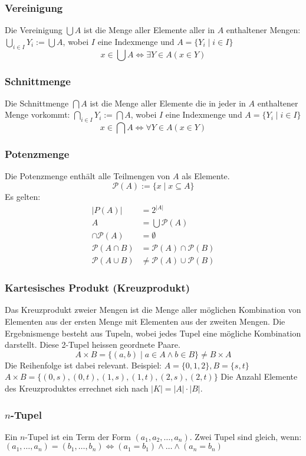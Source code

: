 \subsubsection{Vereinigung}
Die Vereinigung $\bigcup A$ ist die Menge aller Elemente aller in $A$ enthaltener Mengen: 
$\bigcup_{i \in I} Y_i := \bigcup A$, wobei $I$ eine Indexmenge und $A = \{Y_i \mid i \in I\}$
\begin{equation*}
	x \in \bigcup A \Leftrightarrow \exists Y \in A (x \in Y)
\end{equation*}

\subsubsection{Schnittmenge}
Die Schnittmenge $\bigcap A$ ist die Menge aller Elemente die in jeder in $A$ enthaltener Menge vorkommt:
$\bigcap_{i \in I} Y_i := \bigcap A$, wobei $I$ eine Indexmenge und $A = \{Y_i \mid i \in I\}$
\begin{equation*}
	x \in \bigcap A \Leftrightarrow \forall Y \in A (x \in Y)
\end{equation*}

\subsubsection{Potenzmenge}
Die Potenzmenge enthält alle Teilmengen von $A$ als Elemente.
\begin{equation*}
	\mathcal{P}(A) := \{x \mid x \subseteq A\}
\end{equation*}
Es gelten:
\begin{align*}
	|P(A)|& = 2^{|A|}\\
	A& = \bigcup \mathcal{P}(A)\\
	\cap \mathcal{P}(A)& = \emptyset\\
	\mathcal{P}(A \cap B)& = \mathcal{P}(A) \cap \mathcal{P}(B) \\
	\mathcal{P}(A \cup B)& \neq \mathcal{P}(A) \cup \mathcal{P}(B)
\end{align*}

\subsubsection{Kartesisches Produkt (Kreuzprodukt)}
Das Kreuzprodukt zweier Mengen ist die Menge aller möglichen Kombination von Elementen aus der ersten
Menge mit Elementen aus der zweiten Mengen. Die Ergebnismenge besteht aus Tupeln, wobei jedes Tupel
eine mögliche Kombination darstellt. Diese 2-Tupel heissen geordnete Paare.
\begin{equation*}
		A \times B = \{(a, b) \mid a \in A \wedge b \in B\} \neq B \times A
\end{equation*}
Die Reihenfolge ist dabei relevant. Beispiel: $A = \{0, 1, 2\}, B = \{s, t\}$\\
$ A \times B = \{(0, s), (0, t), (1, s), (1, t), (2, s), (2, t)\}$
Die Anzahl Elemente des Kreuzproduktes errechnet sich nach $|K| = |A| \cdot |B|$.

\subsubsection{$n$-Tupel}
Ein $n$-Tupel ist ein Term der Form $(a_1, a_2, \dots, a_n)$.
Zwei Tupel sind gleich, wenn: $(a_1, \dots, a_n) = (b_1, \dots, b_n) \Leftrightarrow (a_1 = b_1) \wedge \dots \wedge (a_n = b_n)$